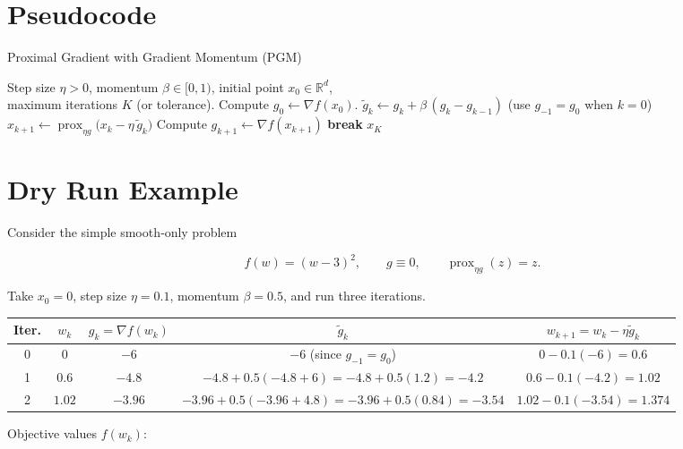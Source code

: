 \documentclass[11pt]{article}
\begin{document}
\section*{Pseudocode}
\begin{algorithm}[H]
\caption{Proximal Gradient with Gradient Momentum (PGM)}
\begin{algorithmic}[1]
\REQUIRE Step size $\eta>0$, momentum $\beta\in[0,1)$, initial point $x_{0}\in\mathbb{R}^{d}$, \\
         maximum iterations $K$ (or tolerance).
\STATE Compute $g_{0}\gets\nabla f(x_{0})$.
    \STATE $\displaystyle \tilde g_{k}\gets g_{k}+\beta\,(g_{k}-g_{k-1})$ \quad (use $g_{-1}=g_{0}$ when $k=0$)
    \STATE $x_{k+1}\gets\operatorname{prox}_{\eta g}\!\bigl(x_{k}-\eta\,\tilde g_{k}\bigr)$
    \STATE Compute $g_{k+1}\gets\nabla f(x_{k+1})$
        \STATE \textbf{break}
    \ENDIF
\ENDFOR
\RETURN $x_{K}$
\end{algorithmic}
\end{algorithm}

\section*{Dry Run Example}
Consider the simple smooth‑only problem  

\[
f(w)=(w-3)^{2},\qquad g\equiv 0,\qquad \operatorname{prox}_{\eta g}(z)=z .
\]

Take $x_{0}=0$, step size $\eta=0.1$, momentum $\beta=0.5$, and run three iterations.

\begin{center}
\begin{tabular}{c|c|c|c|c}
\textbf{Iter.}&$w_{k}$&$g_{k}=\nabla f(w_{k})$&$\tilde g_{k}$&$w_{k+1}=w_{k}-\eta\tilde g_{k}$\\ \hline
0 & $0$ & $-6$ & $-6$ (since $g_{-1}=g_{0}$) & $0-0.1(-6)=0.6$\\
1 & $0.6$ & $-4.8$ & $-4.8+0.5(-4.8+6)= -4.8+0.5(1.2)= -4.2$ & $0.6-0.1(-4.2)=1.02$\\
2 & $1.02$ & $-3.96$ & $-3.96+0.5(-3.96+4.8)= -3.96+0.5(0.84)= -3.54$ & $1.02-0.1(-3.54)=1.374$\\
\end{tabular}
\end{center}

Objective values $f(w_{k})$:
\end{document}
